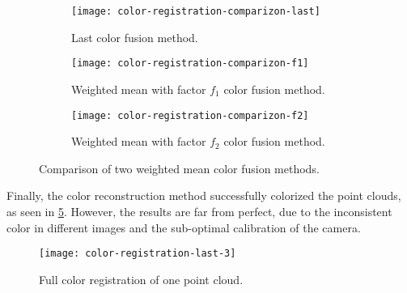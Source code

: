 \begin{figure}[h]
    
    \centering
    \begin{subfigure}[t]{\textwidth}
        \centering
        \texttt{[image: color-registration-comparizon-last]}

        \caption{Last color fusion method.}
        \label{figure:fusion-methods-mean}
    \end{subfigure}

    \begin{subfigure}[t]{\textwidth}
        \centering
        \texttt{[image: color-registration-comparizon-f1]}

        \caption{Weighted mean with factor $f_1$ color fusion method.}
        \label{figure:fusion-methods-f1}
    \end{subfigure}%

    \begin{subfigure}[t]{\textwidth}
        \centering
        \texttt{[image: color-registration-comparizon-f2]}

        \caption{Weighted mean with factor $f_2$ color fusion method.}
        \label{figure:fusion-methods-f2}
    \end{subfigure}

    \caption{Comparison of two weighted mean color fusion methods.}
    \label{figure:fusion-methods-2}

\end{figure}

Finally, the color reconstruction method successfully colorized the point clouds, as seen in \cref{figure:full-color-registration}. However, the results are far from perfect, due to the inconsistent color in different images and the sub-optimal calibration of the camera.

\begin{figure}[h]
    
    \centering
    \texttt{[image: color-registration-last-3]}

    \caption{Full color registration of one point cloud.}
    \label{figure:full-color-registration}
\end{figure}